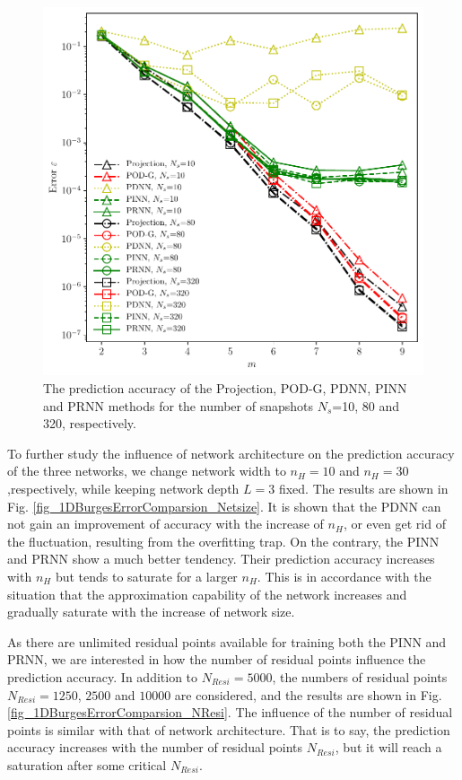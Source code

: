 \documentclass[preprint, 10pt]{elsarticle}
\begin{document}
\begin{figure}[!ht]
  \centering
  \includegraphics[width=12cm]{../../pythonNN/1DBurges/fig/ErrorComparsion_SampleNum.pdf}
\caption{The prediction accuracy of the Projection, POD-G, PDNN, PINN and PRNN methods for the number of snapshots $N_s$=10, 80 and 320, respectively.}
\label{fig_1DBurgesErrorComparsion_SampleNum}
\end{figure}


To further study the influence of network architecture on the prediction accuracy of the three networks, we change network width to $n_H=10$ and $n_H=30$,respectively, while keeping network depth $L=3$ fixed. The results are shown in Fig. \ref{fig_1DBurgesErrorComparsion_Netsize}. It is shown that the PDNN can not gain an improvement of accuracy with the increase of $n_H$, or even get rid of the fluctuation, resulting from the overfitting trap. On the contrary, the PINN and PRNN show a much better tendency. Their prediction accuracy increases with $n_H$ but tends to saturate for a larger $n_H$. This is in accordance with the situation that the approximation capability of the network increases and gradually saturate with the increase of network size.

As there are unlimited residual points available for training both the PINN and PRNN, we are interested in how the number of residual points influence the prediction accuracy. In addition to $N_{Resi}=5000$, the numbers of residual points $N_{Resi}=1250$, $2500$ and $10000$ are considered, and the results are shown in Fig. \ref{fig_1DBurgesErrorComparsion_NResi}. The influence of the number of residual points is similar with that of network architecture. That is to say, the prediction accuracy increases with the number of residual points $N_{Resi}$, but it will reach a saturation after some critical $N_{Resi}$.
\end{document}
